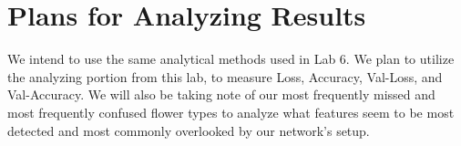 \documentclass[11pt]{article}
\begin{document}
\section{Plans for Analyzing Results}

We intend to use the same analytical methods used in Lab 6. We plan to utilize the analyzing portion from this lab, to measure Loss, Accuracy, Val-Loss, and Val-Accuracy. We will also be taking note of our most frequently missed and most frequently confused flower types to analyze what features seem to be most detected and most commonly overlooked by our network's setup.
\end{document}
